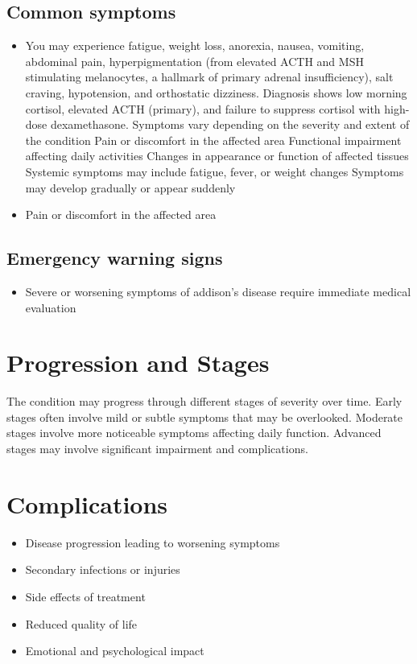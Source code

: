 \subsection{Common symptoms}
\begin{itemize}[noitemsep]
  \item You may experience fatigue, weight loss, anorexia, nausea, vomiting, abdominal pain, hyperpigmentation (from elevated ACTH and MSH stimulating melanocytes, a hallmark of primary adrenal insufficiency), salt craving, hypotension, and orthostatic dizziness. Diagnosis shows low morning cortisol, elevated ACTH (primary), and failure to suppress cortisol with high-dose dexamethasone. Symptoms vary depending on the severity and extent of the condition Pain or discomfort in the affected area Functional impairment affecting daily activities Changes in appearance or function of affected tissues Systemic symptoms may include fatigue, fever, or weight changes Symptoms may develop gradually or appear suddenly
  \item Pain or discomfort in the affected area
  \end{itemize}

\subsection{Emergency warning signs}
\begin{itemize}[noitemsep]
  \item Severe or worsening symptoms of addison's disease require immediate medical evaluation
\end{itemize}
\section{Progression and Stages}
The condition may progress through different stages of severity over time. Early stages often involve mild or subtle symptoms that may be overlooked. Moderate stages involve more noticeable symptoms affecting daily function. Advanced stages may involve significant impairment and complications.
\section{Complications}
\begin{itemize}[noitemsep]
  \item Disease progression leading to worsening symptoms
  \item Secondary infections or injuries
  \item Side effects of treatment
  \item Reduced quality of life
  \item Emotional and psychological impact
\end{itemize}
